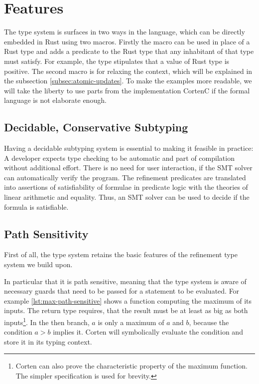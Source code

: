 \documentclass[twoside, english]{sdqthesis}
\theoremstyle{definition}
\begin{document}
\section{Features}


The type system is surfaces in two ways in the language, which can be directly embedded in Rust using two macros. Firstly the macro  can be used in place of a Rust type and adds a predicate to the Rust type that any inhabitant of that type must satisfy. For example, the type  stipulates that a value of Rust type  is positive. The second macro is  for relaxing the context, which will be explained in the subsection \ref{subsec:atomic-updates}.
To make the examples more readable, we will take the liberty to use parts from the implementation CortenC if the formal language is not elaborate enough.

\subsection{Decidable, Conservative Subtyping}

Having a decidable subtyping system is essential to making it feasible in practice: A developer expects type checking to be automatic and part of compilation without additional effort. There is no need for user interaction, if the SMT solver can automatically verify the program.
The refinement predicates are translated into assertions of satisfiability of formulae in predicate logic with the theories of linear arithmetic and equality. Thus, an SMT solver can be used to decide if the formula is satisfiable.


\label{subsec:path-sensitivify}\subsection{Path Sensitivity}

First of all, the type system retains the basic features of the refinement type system we build upon.

In particular that it is path sensitive, meaning that the type system is aware of necessary guards that need to be passed for a statement to be evaluated. For example \cref{lst:max-path-sensitive} shows a function computing the maximum of its inputs. 
The return type requires, that the result must be at least as big as both inputs\footnote{Corten can also prove the characteristic property of the maximum function. The simpler specification is used for brevity.}. In the then branch, $a$ is only a maximum of $a$ and $b$, because the condition $a > b$ implies it. Corten will symbolically evaluate the condition and store it in its typing context.
\end{document}
